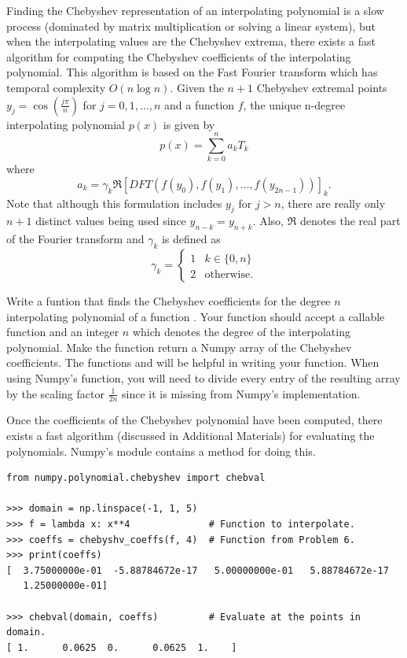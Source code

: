 Finding the Chebyshev representation of an interpolating polynomial is a slow process (dominated by matrix multiplication or solving a linear system), but when the interpolating values are the 
Chebyshev extrema, there exists a fast algorithm for computing the Chebyshev coefficients of the interpolating polynomial.
This algorithm is based on the Fast Fourier transform which has temporal complexity $O(n\log n)$.
Given the $n+1$ Chebyshev extremal points $y_j=\cos(\frac{j\pi}{n})$ for $j=0,1,\dots,n$ and a function $f$, the unique n-degree interpolating polynomial $p(x)$ is given by
\[
p(x)=\sum_{k=0}^na_kT_k
\]
where 
\[
a_k = \gamma_k \Re \left[ DFT(f(y_0), f(y_1),\dots, f(y_{2n-1}))\right]_k.
\]
Note that although this formulation includes $y_j$ for $j>n$, there are really only $n+1$ distinct values being used since $y_{n-k}=y_{n+k}$.
Also, $\Re$ denotes the real part of the Fourier transform and $\gamma_k$ is defined as
\[
\gamma_k = 
\begin{cases}
1 & k\in \{0,n\} \\
2 & \text{otherwise.}
\end{cases}
\]

\begin{problem}
Write a funtion that finds the Chebyshev coefficients for the degree $n$ interpolating polynomial of a function .
Your function should accept a callable function  and an integer $n$ which denotes the degree of the interpolating polynomial.
Make the function return a Numpy array of the Chebyshev coefficients.
The functions  and  will be helpful in writing your function.
When using Numpy's  function, you will need to divide every entry of the resulting array by the scaling factor $\frac{1}{2n}$ since it is missing from Numpy's implementation.
\end{problem}

Once the coefficients of the Chebyshev polynomial have been computed, there exists a fast algorithm (discussed in Additional Materials) for evaluating the polynomials.
Numpy's  module contains a method for doing this.
\begin{lstlisting}
from numpy.polynomial.chebyshev import chebval

>>> domain = np.linspace(-1, 1, 5)
>>> f = lambda x: x**4              # Function to interpolate.
>>> coeffs = chebyshv_coeffs(f, 4)  # Function from Problem 6.
>>> print(coeffs)
[  3.75000000e-01  -5.88784672e-17   5.00000000e-01   5.88784672e-17
   1.25000000e-01]

>>> chebval(domain, coeffs)         # Evaluate at the points in domain.
[ 1.      0.0625  0.      0.0625  1.    ]
\end{lstlisting}

